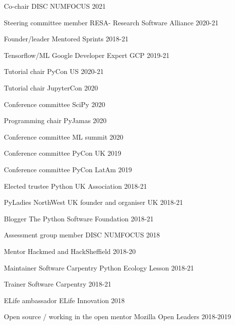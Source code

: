 


\begin{cvpress}

\cvpres
{Co-chair}
{DISC NUMFOCUS}
{2021}

\cvpres
{Steering committee member}
{RESA- Research Software Alliance}
{2020-21}

\cvpres
{Founder/leader}
{Mentored Sprints}
{2018-21}

\cvpres
{Tensorflow/ML Google Developer Expert}
{GCP}
{2019-21}

\cvpres
{Tutorial chair}
{PyCon US}
{2020-21}

\cvpres
{Tutorial chair}
{JupyterCon}
{2020}

\cvpres
{Conference committee}
{SciPy}
{2020}

\cvpres
{Programming chair}
{PyJamas}
{2020}

\cvpres
{Conference committee}
{ML summit}
{2020}

\cvpres
{Conference committee}
{PyCon UK}
{2019}

\cvpres
{Conference committee}
{PyCon LatAm}
{2019}

\cvpres
{Elected trustee} %
{Python UK Association}
{2018-21}

\cvpres
{PyLadies NorthWest UK founder and organiser} %
{UK}
{2018-21}

\cvpres
{Blogger} %
{The Python Software Foundation}
{2018-21}


\cvpres
{Assessment group member}
{DISC NUMFOCUS}
{2018}

\cvpres
{Mentor}
{Hackmed and HackSheffield}
{2018-20}

\cvpres
{Maintainer} %
{Software Carpentry Python Ecology Lesson}
{2018-21}

\cvpres
{Trainer} %
{Software Carpentry}
{2018-21}

\cvpres
{ELife ambassador}
{ELife Innovation}
{2018}

\cvpres
{Open source / working in the open mentor} %
{Mozilla Open Leaders} %
{2018-2019} %


\end{cvpress}
